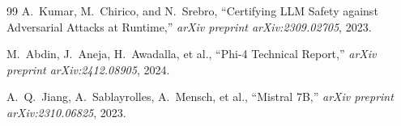 \documentclass[11pt,a4paper]{article}
\theoremstyle{definition}
\begin{document}
\begin{thebibliography}{99}
A.~Kumar, M.~Chirico, and N.~Srebro, ``Certifying LLM Safety against Adversarial Attacks at Runtime,'' \textit{arXiv preprint arXiv:2309.02705}, 2023.

M.~Abdin, J.~Aneja, H.~Awadalla, et al., ``Phi-4 Technical Report,'' \textit{arXiv preprint arXiv:2412.08905}, 2024.

A.~Q.~Jiang, A.~Sablayrolles, A.~Mensch, et al., ``Mistral 7B,'' \textit{arXiv preprint arXiv:2310.06825}, 2023.

\end{thebibliography}
\end{document}
